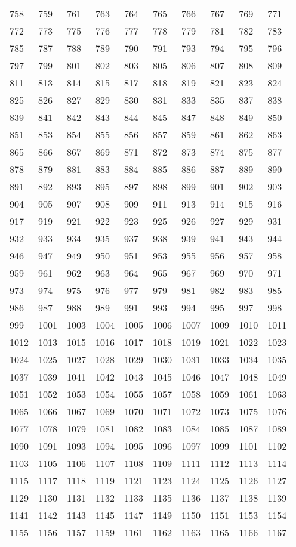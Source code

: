 \begin{longtable}{*{10}{l}}
758&759&761&763&764&765&766&767&769&771\\
772&773&775&776&777&778&779&781&782&783\\
785&787&788&789&790&791&793&794&795&796\\
797&799&801&802&803&805&806&807&808&809\\
811&813&814&815&817&818&819&821&823&824\\
825&826&827&829&830&831&833&835&837&838\\
839&841&842&843&844&845&847&848&849&850\\
851&853&854&855&856&857&859&861&862&863\\
865&866&867&869&871&872&873&874&875&877\\
878&879&881&883&884&885&886&887&889&890\\
891&892&893&895&897&898&899&901&902&903\\
904&905&907&908&909&911&913&914&915&916\\
917&919&921&922&923&925&926&927&929&931\\
932&933&934&935&937&938&939&941&943&944\\
946&947&949&950&951&953&955&956&957&958\\
959&961&962&963&964&965&967&969&970&971\\
973&974&975&976&977&979&981&982&983&985\\
986&987&988&989&991&993&994&995&997&998\\
999&1001&1003&1004&1005&1006&1007&1009&1010&1011\\
1012&1013&1015&1016&1017&1018&1019&1021&1022&1023\\
1024&1025&1027&1028&1029&1030&1031&1033&1034&1035\\
1037&1039&1041&1042&1043&1045&1046&1047&1048&1049\\
1051&1052&1053&1054&1055&1057&1058&1059&1061&1063\\
1065&1066&1067&1069&1070&1071&1072&1073&1075&1076\\
1077&1078&1079&1081&1082&1083&1084&1085&1087&1089\\
1090&1091&1093&1094&1095&1096&1097&1099&1101&1102\\
1103&1105&1106&1107&1108&1109&1111&1112&1113&1114\\
1115&1117&1118&1119&1121&1123&1124&1125&1126&1127\\
1129&1130&1131&1132&1133&1135&1136&1137&1138&1139\\
1141&1142&1143&1145&1147&1149&1150&1151&1153&1154\\
1155&1156&1157&1159&1161&1162&1163&1165&1166&1167\\

\end{longtable}
